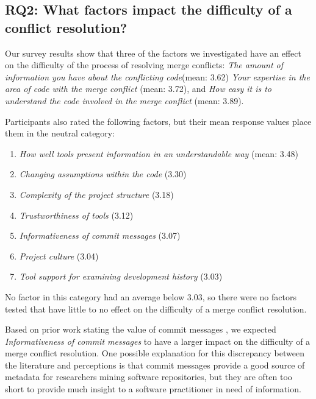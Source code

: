 \subsection{RQ2: What factors impact the difficulty of a conflict resolution?}\label{RQ2}


Our survey results show that three of the factors we investigated have an effect on the difficulty of the process of resolving merge conflicts: \textit{The amount of information you have about the conflicting code}(mean: 3.62) \textit{Your expertise in the area of code with the merge conflict} (mean: 3.72), and \textit{How easy it is to understand the code involved in the merge conflict} (mean: 3.89). 

Participants also rated the following factors, but their mean response values place them in the neutral category:
\begin{enumerate}
	\item \textit{How well tools present information in an understandable way} (mean: 3.48)
	\item \textit{Changing assumptions within the code} (3.30)
	\item \textit{Complexity of the project structure} (3.18)
	\item \textit{Trustworthiness of tools} (3.12)
	\item \textit{Informativeness of commit messages} (3.07)
	\item \textit{Project culture} (3.04)
	\item \textit{Tool support for examining development history} (3.03)
\end{enumerate}

No factor in this category had an average below 3.03, so there were no factors tested that have little to no effect on the difficulty of a merge conflict resolution.

Based on prior work stating the value of commit messages \cite{yamauchi2014clustering} \cite{hindle2009automatic} \cite{cortes2014automatically} \cite{hattori2008nature}, we expected \textit{Informativeness of commit messages} to have a larger impact on the difficulty of a merge conflict resolution. One possible explanation for this discrepancy between the literature and perceptions is that commit messages provide a good source of metadata for researchers mining software repositories, but they are often too short to provide much insight to a software practitioner in need of information.